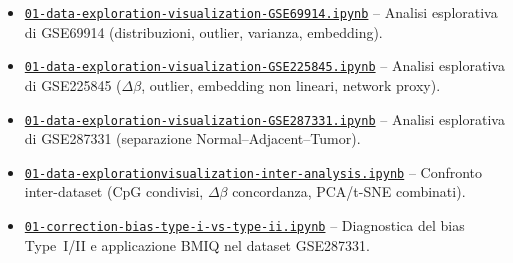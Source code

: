 \documentclass[10pt]{extarticle}
\begin{document}
\begin{itemize}[label=-]
  \item \href{https://github.com/elisabettaroviera/THESIS/blob/main/01%20-%20Notebook/01%20-%20Data%20Exploration%20%26%20Visualization/a%20-%20Intra%20Dataset/01-data-exploration-visualization-gse69914.ipynb}{\texttt{01-data-exploration-visualization-GSE69914.ipynb}}  
  -- Analisi esplorativa di GSE69914 (distribuzioni, outlier, varianza, embedding).

  \item \href{https://github.com/elisabettaroviera/THESIS/blob/main/01%20-%20Notebook/01%20-%20Data%20Exploration%20%26%20Visualization/a%20-%20Intra%20Dataset/01-data-exploration-visualization-gse225845.ipynb}{\texttt{01-data-exploration-visualization-GSE225845.ipynb}}  
  -- Analisi esplorativa di GSE225845 ($\Delta\beta$, outlier, embedding non lineari, network proxy).

  \item \href{https://github.com/elisabettaroviera/THESIS/blob/main/01%20-%20Notebook/01%20-%20Data%20Exploration%20%26%20Visualization/a%20-%20Intra%20Dataset/01-data-exploration-visualization-gse287331.ipynb}{\texttt{01-data-exploration-visualization-GSE287331.ipynb}}  
  -- Analisi esplorativa di GSE287331 (separazione Normal–Adjacent–Tumor).

  \item \href{https://github.com/elisabettaroviera/THESIS/blob/main/01%20-%20Notebook/01%20-%20Data%20Exploration%20%26%20Visualization/b%20-%20Inter%20Dataset/01-data-explorationvisualization-inter-analysis.ipynb}{\texttt{01-data-explorationvisualization-inter-analysis.ipynb}}  
  -- Confronto inter-dataset (CpG condivisi, $\Delta\beta$ concordanza, PCA/t-SNE combinati).

  \item \href{https://github.com/elisabettaroviera/THESIS/blob/main/01%20-%20Notebook/01%20-%20Data%20Exploration%20%26%20Visualization/01-correction-bias-type-i-vs-type-ii.ipynb}{\texttt{01-correction-bias-type-i-vs-type-ii.ipynb}}  
  -- Diagnostica del bias Type~I/II e applicazione BMIQ nel dataset GSE287331.

\end{itemize}
\end{document}
